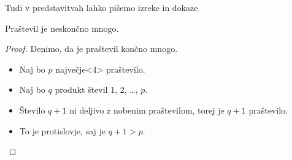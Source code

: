 \begin{frame}{Tudi v predstavitvah lahko pišemo izreke in dokaze}

	\begin{izrek}
	   Praštevil je neskončno mnogo.
	\end{izrek}
	\begin{proof}
	   Denimo, da je praštevil končno mnogo.
	   \begin{itemize}
		  \item<+-> Naj bo $p$ \alert{največje}<4> praštevilo.
		  \item<+-> Naj bo $q$ produkt števil $1$, $2$, \ldots, $p$.
		  \item<+-> Število $q+1$ ni deljivo z nobenim praštevilom, torej je $q+1$ praštevilo.
		  \item<+-> To je protislovje, saj je $q+1>p$. \qedhere
	   \end{itemize}
	\end{proof}
 \end{frame}
 
